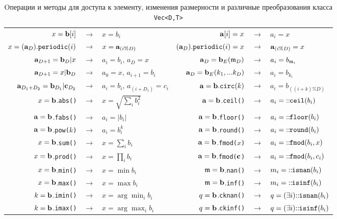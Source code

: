 \begin{table}
\begin{center}
\begin{tabular}{|rcl|rcl|}
\hline
$ x = \mathbf{b}[i]$ &$\to$& $x = b_i$  & $ \mathbf{a}[i] = x$ &$\to$& $a_i = x$ \\
$x = (\mathbf{a}_D){\tt.periodic}(i)$ &$\to$ & $x=\mathbf{a}_{(i\%D)}$ & $(\mathbf{a}_D){\tt.periodic}(i) = x$ &$\to$ & $\mathbf{a}_{(i\%D)} = x$ \\
\hline
$ \mathbf{a}_{D+1} = \mathbf{b}_D|x$ &$\to$& $a_i = b_i,\, a_D=x$ & $ \mathbf{a}_D = \mathbf{b}_E(\mathfrak{m}_D)$ &$\to$& $a_i = b_{\mathfrak{m}_i}$ \\
$ \mathbf{a}_{D+1} = x|\mathbf{b}_D$ &$\to$& $a_0 = x,\, a_{i+1}=b_i$ & $ \mathbf{a}_D = \mathbf{b}_E(k_1, ... k_D)$ &$\to$& $a_i = b_{k_i}$ \\
$ \mathbf{a}_{D_1+D_2} = \mathbf{b}_{D_1}|\mathbf{c}_{D_2}$ &$\to$& $a_i = b_i,\, a_{(i+D_1)}=c_i$ & $ \mathbf{a} = \mathbf{b}{\tt.circ}(k)$ &$\to$& $a_i=b_{((i+k)\%D)}$ \\
\hline
$x=\mathbf{b}$.{\tt abs()} &$\to$& $x=\sqrt{\sum_i b_i^2}$ & $\mathbf{a}=\mathbf{b}$.{\tt ceil()} &$\to$& $a_i={\tt ::\!\!ceil}(b_i)$ \\
$\mathbf{a}=\mathbf{b}$.{\tt fabs()} &$\to$& $a_i=|b_i|$ & $\mathbf{a}=\mathbf{b}$.{\tt floor()} &$\to$& $a_i={\tt ::\!\!floor}(b_i)$ \\
$\mathbf{a}=\mathbf{b}$.{\tt pow($k$)} &$\to$& $a_i=b_i^k$ & $\mathbf{a}=\mathbf{b}$.{\tt round()} &$\to$& $a_i={\tt ::\!\!round}(b_i)$  \\
$x=\mathbf{b}$.{\tt sum()} &$\to$& $x=\sum_i b_i$ & $\mathbf{a}=\mathbf{b}$.{\tt fmod($x$)} &$\to$& $a_i={\tt ::\!\!fmod}(b_i, x)$ \\
$x=\mathbf{b}$.{\tt prod()} &$\to$& $x=\prod_i b_i$ & $\mathbf{a}=\mathbf{b}$.{\tt fmod($\mathbf{c}$)} &$\to$& $a_i={\tt ::\!\!fmod}(b_i, c_i)$ \\
$x=\mathbf{b}$.{\tt min()} &$\to$& $x=\min b_i$ & $\mathfrak{m}=\mathbf{b}$.{\tt nan()} &$\to$& $m_i={\tt::\!\!isnan}(b_i)$ \\
$x=\mathbf{b}$.{\tt max()} &$\to$& $x=\max b_i$ & $\mathfrak{m}=\mathbf{b}$.{\tt inf()} &$\to$& $m_i={\tt::\!\!isinf}(b_i)$ \\
$k=\mathbf{b}$.{\tt imin()} &$\to$& $x=\arg\min_i b_i$ & $q=\mathbf{b}$.{\tt cknan()} &$\to$& $q=(\exists i){\tt::\!\!isnan}(b_i)$ \\
$k=\mathbf{b}$.{\tt imax()} &$\to$& $x=\arg\max_i b_i$ & $q=\mathbf{b}$.{\tt ckinf()} &$\to$& $q=(\exists i){\tt::\!\!isinf}(b_i)$ \\
\hline
\end{tabular}
\end{center}
\caption{Oперации и методы для доступа к элементу, изменения размерности и различные преобразования класса {\tt Vec<D,T>}
}\label{vec:func:table}
\end{table}

